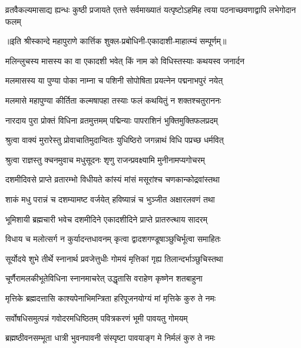 \threelineshloka
{व्रतवैकल्यमासाद्य ह्यन्धः कुष्ठी प्रजायते}
{एतत्ते सर्वमाख्यातं यत्पृष्टोऽहमिह त्वया}
{पठनाच्छवणाद्वापि लभेगोदान फलम्} %

॥इति श्रीस्कान्दे महापुराणे कार्त्तिक शुक्ल-प्रबोधिनी-एकादाशी-माहात्म्यं सम्पूर्णम्॥



\twolineshloka
{मलिन्लुचस्य मासस्य का वा एकादशी भवेत्}
{किं नाम को विधिस्तस्याः कथयस्व जनार्दन} %


\twolineshloka
{मलमासस्य या पुण्या पोका नाम्ना च पशिनी}
{सोपोषिता प्रयत्नेन पद्मनाभपुरं नयेत्} %

\twolineshloka
{मलमासे महापुण्या कीर्तिता कल्मषापहा}
{तस्याः फलं कथयितुं न शक्तश्चतुराननः} %

\twolineshloka
{नारदाय पुरा प्रोक्तं विधिना व्रतमुत्तमम्}
{पद्मिन्याः पापराशिनं भुक्तिमुक्तिफलप्रदम्} %

\twolineshloka
{श्रुत्वा वाक्यं मुरारेस्तु प्रोवाचातिमुदान्वितः}
{युधिष्ठिरो जगन्नाथं विधि पप्रच्छ धर्मवित्} %

\twolineshloka
{श्रुत्वा राज्ञस्तु क्चनमुवाच मधुसूदनः}
{शृणु राजन्प्रवक्ष्यामि मुनीनामप्यगोचरम्} %

\twolineshloka
{दशमीदिवसे प्राप्ते व्रतारम्भो विधीयते}
{कांस्यं मांसं मसूरांश्च चणकान्कोद्रवांस्तथा} %

\twolineshloka
{शाकं मधु परान्नं च दशम्यामष्ट वर्जयेत्}
{हविष्यान्नं च भुञ्जीत अक्षारलवणं तथा} %

\twolineshloka
{भूमिशायी ब्रह्मचारी भवेच दशमीदिने}
{एकादशीदिने प्राप्ते प्रातरुत्थाय सादरम्} %

\twolineshloka
{विधाय च मलोत्सर्ग न कुर्यादन्तधावनम्}
{कृत्वा द्वादशगण्डूषाञ्छुचिर्भूत्वा समाहितः} %

\twolineshloka
{सूर्योदये शुभे तीर्थे स्नानार्थ प्रवजेत्तुधीः}
{गोमयं मृत्तिकां गृह्य तिलान्दर्भाञ्छुचिस्तथा} %

\twolineshloka
{चूर्णैरामलकीभूतेविधिना स्नानमाचरेत्}
{उद्धृतासि वराहेण कृष्णेन शतबाहुना} %

\twolineshloka
{मृत्तिके ब्रह्मदत्तासि काश्यपेनाभिमन्त्रिता}
{हरिपूजनयोग्यं मां मृत्तिके कुरु ते नमः} %

\twolineshloka
{सर्वोषधिसमुत्पन्नं गवोदरमधिष्ठितम्}
{पवित्रकरणं भूमी पावयतु गोमयम्} %

\twolineshloka
{ब्रह्मष्ठीवनसम्भूता धात्री भुवनपावनी}
{संस्पृष्टा पावयाङ्ग मे निर्मलं कुरु ते नमः} %

